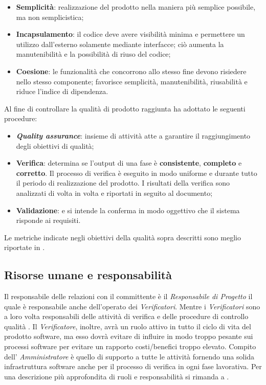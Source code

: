 \begin{itemize}
\item \textbf{Semplicità}: realizzazione del prodotto nella maniera più semplice possibile, ma non semplicistica;
\item \textbf{Incapsulamento}: il codice deve avere visibilità minima e permettere un utilizzo dall’esterno solamente mediante interfacce; ciò aumenta la manutenibilità e la possibilità di riuso del codice;
\item \textbf{Coesione}: le funzionalità che concorrono allo stesso fine devono risiedere nello stesso componente; favorisce semplicità, manutenibilità, riusabilità e riduce l’indice di dipendenza.
\end{itemize}
Al fine di controllare la qualità di prodotto raggiunta \gruppo ha adottato le seguenti procedure:
\begin{itemize}
\item \textbf{\textit{Quality assurance}}: insieme di attività atte a garantire il raggiungimento degli obiettivi di qualità;
\item \textbf{Verifica}: determina se l'output di una fase è \textbf{consistente}, \textbf{completo} e \textbf{corretto}. Il processo di verifica è eseguito in modo uniforme e durante tutto il periodo di realizzazione del prodotto. I risultati della verifica sono analizzati di volta in volta e riportati in seguito al documento;
\item \textbf{Validazione}: e si intende la conferma in modo oggettivo che il sistema risponde ai requisiti.
\end{itemize}
Le metriche indicate negli obiettivi della qualità sopra descritti sono meglio riportate in \infoNDP.
\subsection{Risorse umane e responsabilità}
Il responsabile delle relazioni con il committente è il \textit{Responsabile di Progetto} il quale è responsabile anche dell'operato dei \textit{Verificatori}. Mentre i \textit{Verificatori} sono a loro volta responsabili delle attività di verifica e delle procedure di controllo qualità . Il \textit{Verificatore}, inoltre, avrà un ruolo attivo in tutto il ciclo di vita del prodotto software, ma esso dovrà evitare di influire in modo troppo pesante sui processi software per evitare un rapporto costi/benefici troppo elevato. Compito dell' \textit{Amministratore} è quello di supporto a tutte le attività fornendo una solida infrastruttura software anche per il processo di verifica in ogni fase lavorativa.
Per una descrizione più approfondita di ruoli e responsabilità si rimanda a \infoNDP.\\

